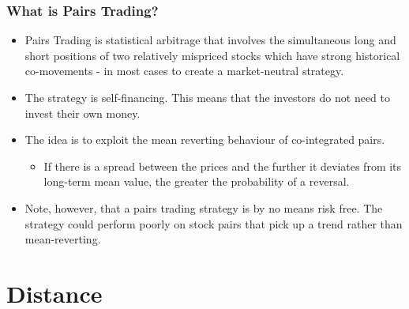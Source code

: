 \documentclass[pdf,9pt,xcolor=dvipsnames,hide notes]{beamer}
\begin{document}
	\begin{frame}[label=frame1]
		\frametitle{What is Pairs Trading?}
		
			
		\begin{itemize}
			\justifying
			
			\item Pairs Trading is statistical arbitrage that involves the simultaneous long and short positions of two relatively mispriced stocks which have strong historical co-movements - in most cases to create a market-neutral strategy.
			
			\vspace{0.3cm}
			
			\item The strategy is self-financing. This means that the investors do not need to invest their own money.
			
			\vspace{0.3cm}
			
			\item The idea is to exploit the mean reverting behaviour of co-integrated pairs. 
			\begin{itemize}
				\item If there is a spread between the prices and the further it deviates from its long-term mean value, the greater the probability of a reversal.
			\end{itemize}
			
			\vspace{0.3cm}
			
			\item Note, however, that a pairs trading strategy is by no means risk free. The strategy could perform poorly on stock pairs that pick up a trend rather than mean-reverting.
			
		\end{itemize}
	\end{frame}

	\section{Distance}
\end{document}
